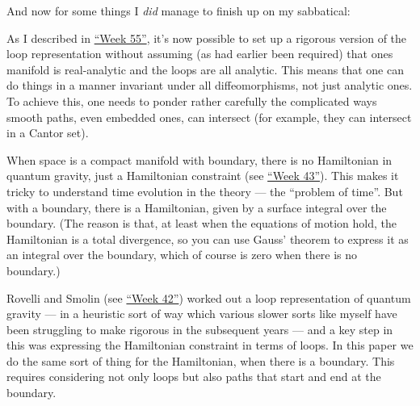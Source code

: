\documentclass{article}
\def\tightlist{}
\renewcommand{\texttt}[1]{%
  \begingroup
  \ttfamily
  \begingroup\lccode`~=`/\lowercase{\endgroup\def~}{/\discretionary{}{}{}}%
  \begingroup\lccode`~=`[\lowercase{\endgroup\def~}{[\discretionary{}{}{}}%
  \begingroup\lccode`~=`.\lowercase{\endgroup\def~}{.\discretionary{}{}{}}%
  \catcode`/=\active\catcode`[=\active\catcode`.=\active
  \scantokens{#1\noexpand}%
  \endgroup
}
\begin{document}
And now for some things I \emph{did} manage to finish up on my
sabbatical:


As I described in \protect\hyperlink{week55}{``Week 55''}, it's now
possible to set up a rigorous version of the loop representation without
assuming (as had earlier been required) that ones manifold is
real-analytic and the loops are all analytic. This means that one can do
things in a manner invariant under all diffeomorphisms, not just
analytic ones. To achieve this, one needs to ponder rather carefully the
complicated ways smooth paths, even embedded ones, can intersect (for
example, they can intersect in a Cantor set).


When space is a compact manifold with boundary, there is no Hamiltonian
in quantum gravity, just a Hamiltonian constraint (see
\protect\hyperlink{week43}{``Week 43''}). This makes it tricky to
understand time evolution in the theory --- the ``problem of time''. But
with a boundary, there is a Hamiltonian, given by a surface integral
over the boundary. (The reason is that, at least when the equations of
motion hold, the Hamiltonian is a total divergence, so you can use
Gauss' theorem to express it as an integral over the boundary, which of
course is zero when there is no boundary.)

Rovelli and Smolin (see \protect\hyperlink{week42}{``Week 42''}) worked
out a loop representation of quantum gravity --- in a heuristic sort of
way which various slower sorts like myself have been struggling to make
rigorous in the subsequent years --- and a key step in this was
expressing the Hamiltonian constraint in terms of loops. In this paper
we do the same sort of thing for the Hamiltonian, when there is a
boundary. This requires considering not only loops but also paths that
start and end at the boundary.
\end{document}
